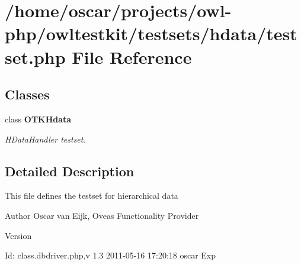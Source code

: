 \section{/home/oscar/projects/owl-\/php/owltestkit/testsets/hdata/testset.php File Reference}
\label{testset_8php}
\subsection*{Classes}
\begin{DoxyCompactItemize}
\item 
class {\bf OTKHdata}
\begin{DoxyCompactList}\small\item\em HDataHandler testset. \end{DoxyCompactList}\end{DoxyCompactItemize}


\subsection{Detailed Description}
This file defines the testset for hierarchical data \begin{DoxyAuthor}{Author}
Oscar van Eijk, Oveas Functionality Provider 
\end{DoxyAuthor}
\begin{DoxyVersion}{Version}

\end{DoxyVersion}
\begin{DoxyParagraph}{Id:}
class.dbdriver.php,v 1.3 2011-\/05-\/16 17:20:18 oscar Exp 
\end{DoxyParagraph}
